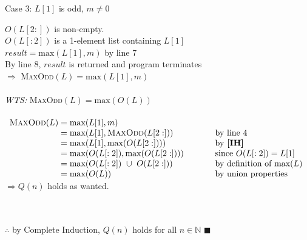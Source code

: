 \documentclass[12pt]{article}
\renewcommand{\qed}{\hfill$\blacksquare$}
\begin{document}
\hfill\begin{minipage}{\dimexpr\textwidth-10mm}
	Case 3: $L[1]$ is odd, $m \not = 0$
	\vspace*{1mm}

	\hfill\begin{minipage}{\dimexpr\textwidth-10mm} %
		$O(L[2:])$ is non-empty.\\
		$O(L[:2])$ is a 1-element list containing $L[1]$\\
		$result = \text{max}(L[1], m)$ by line 7\\
		By line 8, $result$ is returned and program terminates\\
		$\Longrightarrow$  \textsc{MaxOdd}$(L) = \text{max}(L[1], m)$
		\\\\
		\emph{WTS:} \textsc{MaxOdd}$(L)=\text{max}(O(L))$
		\\\\
		$\begin{array}{l@{}>{\displaystyle}ll}
				\text{\textsc{MaxOdd}}(L) & {}= \text{max}(L[1], m)                                  &                                \\
				                          & {}= \text{max}(L[1], \text{\textsc{MaxOdd}}(L[2:]))      & \text{by line 4}               \\
				                          & {}= \text{max}(L[1], \text{max}(O(L[2:])))               & \text{by \textbf{[IH]}}        \\
				                          & {}= \text{max}(O(L[:2]), \text{max}(O(L[2:])))           & \text{since $O(L[:2]) = L[1]$} \\
				                          & {}= \text{max}(O(L[:2]) \ \cup \ O(L[2:])) \qquad \qquad & \text{by definition of max}(L) \\
				                          & {}= \text{max}(O(L))                                     & \text{by union properties}     \\
			\end{array}$
		$\Longrightarrow Q(n)$ holds as wanted.
	\end{minipage}
\end{minipage}
\\\\
$\therefore$ by Complete Induction, $Q(n)$ holds for all $n \in \mathbb{N}$ \qed
\end{document}
